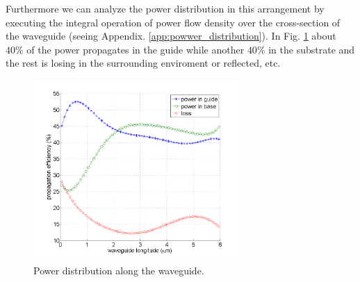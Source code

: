 Furthermore we can analyze the power distribution in this arrangement by executing the integral operation of power flow density over the cross-section of the waveguide (seeing Appendix. \ref{app:powwer_distribution}).  In Fig. \ref{fig:power_distribution} about $40\%$ of the power propagates in the guide while another $40\%$ in the substrate and the rest is losing in the surrounding enviroment or reflected, etc.\\
\begin{figure}[!ht]
\centering
\includegraphics[width=0.7\textwidth]{bilder/power_distribution1}
\caption{Power distribution along the waveguide.}
\label{fig:power_distribution}
\end{figure}
